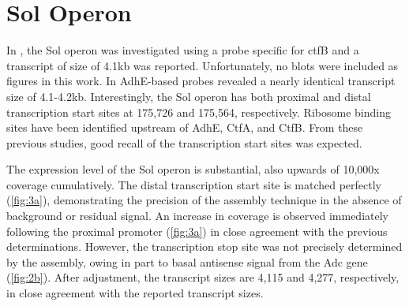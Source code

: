 \section{Sol Operon}
In \cite{65}, the Sol operon was investigated using a probe specific for ctfB and a transcript of size of 4.1kb was reported. Unfortunately, no blots were included as figures in this work. In \cite{63} AdhE-based probes revealed a nearly identical transcript size of 4.1-4.2kb. Interestingly, the Sol operon has both proximal and distal transcription start sites at 175,726 and 175,564, respectively\cite{62,63}. Ribosome binding sites have been identified upstream of AdhE, CtfA, and CtfB\cite{63}. From these previous studies, good recall of the transcription start sites was expected.

The expression level of the Sol operon is substantial, also upwards of 10,000x coverage cumulatively. The distal transcription start site is matched perfectly (\ref{fig:3a}), demonstrating the precision of the assembly technique in the absence of background or residual signal. An increase in coverage is observed immediately following the proximal promoter (\ref{fig:3a}) in close agreement with the previous determinations\cite{62,63}. However, the transcription stop site was not precisely determined by the assembly, owing in part to basal antisense signal from the Adc gene (\ref{fig:2b}). After adjustment, the transcript sizes are 4,115 and 4,277, respectively, in close agreement with the reported transcript sizes\cite{63,65}.

